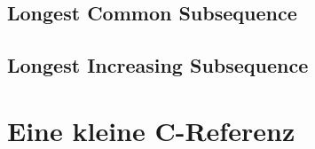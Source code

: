 \documentclass[10pt,a4paper,ngerman]{article}
\begin{document}
\subsection{Longest Common Subsequence}

\subsection{Longest Increasing Subsequence}

\section{Eine kleine C-Referenz}




\end{document}
